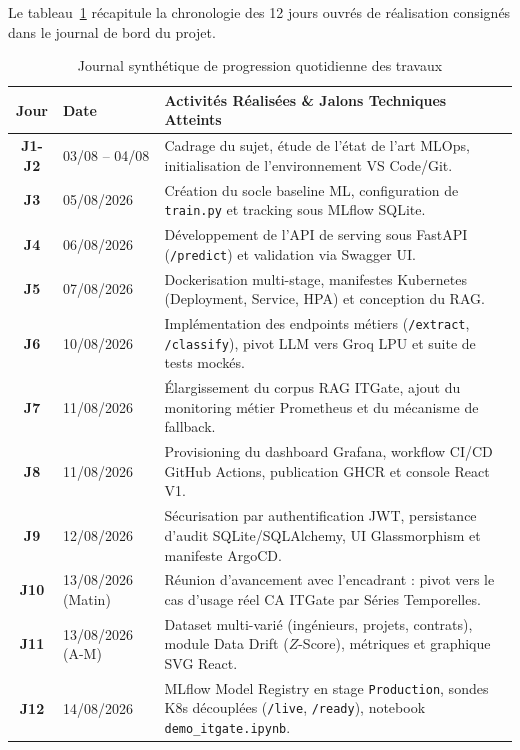\documentclass[11pt,a4paper,oneside]{report}
\begin{document}
Le tableau~\ref{tab:journal_avancement} récapitule la chronologie des 12 jours ouvrés de réalisation consignés dans le journal de bord du projet.

\begin{table}[H]
\centering
\small
{}
\begin{tabularx}{\textwidth}{@{}cp{3cm}X@{}}
\toprule
\textbf{Jour} & \textbf{Date} & \textbf{Activités Réalisées \& Jalons Techniques Atteints} \\ \midrule
\textbf{J1-J2} & 03/08 -- 04/08 & Cadrage du sujet, étude de l'état de l'art MLOps, initialisation de l'environnement VS Code/Git. \\
\textbf{J3} & 05/08/2026 & Création du socle baseline ML, configuration de \texttt{train.py} et tracking sous MLflow SQLite. \\
\textbf{J4} & 06/08/2026 & Développement de l'API de serving sous FastAPI (\texttt{/predict}) et validation via Swagger UI. \\
\textbf{J5} & 07/08/2026 & Dockerisation multi-stage, manifestes Kubernetes (Deployment, Service, HPA) et conception du RAG. \\
\textbf{J6} & 10/08/2026 & Implémentation des endpoints métiers (\texttt{/extract}, \texttt{/classify}), pivot LLM vers Groq LPU et suite de tests mockés. \\
\textbf{J7} & 11/08/2026 & Élargissement du corpus RAG ITGate, ajout du monitoring métier Prometheus et du mécanisme de fallback. \\
\textbf{J8} & 11/08/2026 & Provisioning du dashboard Grafana, workflow CI/CD GitHub Actions, publication GHCR et console React V1. \\
\textbf{J9} & 12/08/2026 & Sécurisation par authentification JWT, persistance d'audit SQLite/SQLAlchemy, UI Glassmorphism et manifeste ArgoCD. \\
\textbf{J10} & 13/08/2026 (Matin) & Réunion d'avancement avec l'encadrant : pivot vers le cas d'usage réel CA ITGate par Séries Temporelles. \\
\textbf{J11} & 13/08/2026 (A-M) & Dataset multi-varié (ingénieurs, projets, contrats), module Data Drift ($Z$-Score), métriques et graphique SVG React. \\
\textbf{J12} & 14/08/2026 & MLflow Model Registry en stage \texttt{Production}, sondes K8s découplées (\texttt{/live}, \texttt{/ready}), notebook \texttt{demo\_itgate.ipynb}. \\ \bottomrule
\end{tabularx}
\caption{Journal synthétique de progression quotidienne des travaux}
\label{tab:journal_avancement}
\end{table}
\end{document}
